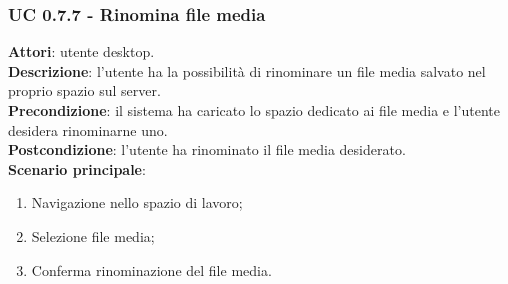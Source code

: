 	\subsubsection{UC 0.7.7 - Rinomina file media}{
		\label{uc0.7.7}
		\textbf{Attori}: utente desktop.	\\
		\textbf{Descrizione}: l'utente ha la possibilità di rinominare un file media salvato nel proprio spazio sul server. \\
		\textbf{Precondizione}: il sistema ha caricato lo spazio dedicato ai file media e l'utente desidera rinominarne uno.	\\
		\textbf{Postcondizione}: l'utente ha rinominato il file media desiderato.	\\
		\textbf{Scenario principale}:
		\begin{enumerate}
			\item Navigazione nello spazio di lavoro;
			\item Selezione file media;
			\item Conferma rinominazione del file media.
		\end{enumerate}
		}
